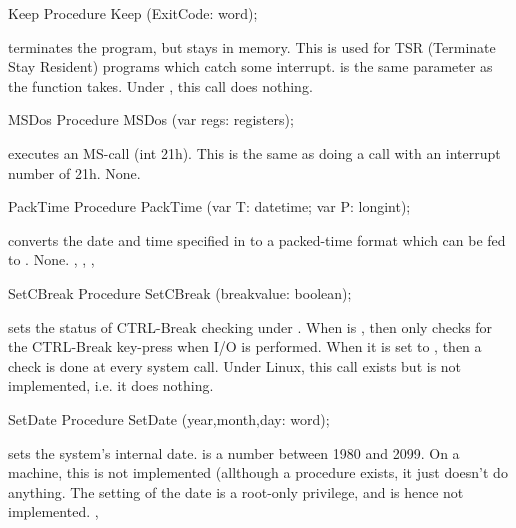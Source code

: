 \begin{procedure}{Keep}
\Declaration
Procedure Keep (ExitCode: word);

\Description

 terminates the program, but stays in memory. This is used for TSR
(Terminate Stay Resident) programs which catch some interrupt.
 is the same parameter as the  function takes.
\Errors
Under \linux, this call does nothing.
\SeeAlso
{}
\end{procedure}
\begin{procedure}{MSDos}
\Declaration
Procedure MSDos (var regs: registers);

\Description

 executes an MS-\dos call (int 21h). This is the same as doing a
 call with an interrupt number of 21h.
\Errors
None.
\SeeAlso
{}
\end{procedure}
\begin{procedure}{PackTime}
\Declaration
Procedure PackTime (var T: datetime; var P: longint);

\Description

 converts the date and time specified in 
to a packed-time format which can be fed to .
\Errors
None.
\SeeAlso
{}, , , 
\end{procedure}
\latex{}
\html{}
\begin{procedure}{SetCBreak}
\Declaration
Procedure SetCBreak (breakvalue: boolean);

\Description

 sets the status of CTRL-Break checking under \dos.
When  is , then \dos only checks for the 
CTRL-Break key-press when I/O is performed. When it is set to ,
then a check is done at every system call.
\Errors
Under Linux, this call exists
but is not implemented, i.e. it does nothing.
\SeeAlso
{}
\end{procedure}
\begin{procedure}{SetDate}
\Declaration
Procedure SetDate (year,month,day: word);

\Description

 sets the system's internal date.  is a number
between 1980 and 2099.
\Errors
On a \linux  machine, this is not implemented (allthough a procedure
exists, it just doesn't do anything. The setting of the date is a
root-only privilege, and is hence not implemented.
\SeeAlso
{},
\end{procedure}

